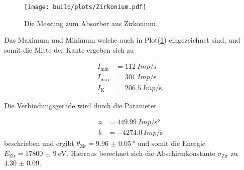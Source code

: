           \begin{figure}[H]
            \centering
            \texttt{[image: build/plots/Zirkonium.pdf]}
            \caption{Die Messung zum Absorber aus Zirkonium.}
            \label{fig:zirkonium}
          \end{figure}

          \noindent Das Maximum und Minimum welche auch in Plot(\ref{fig:zirkonium}) eingezeichnet sind, und somit die Mitte der Kante ergeben sich 
          zu

          \begin{align*}
              I_{\text{min}} &= \SI{112}{Imp\per\second}\\
              I_{\text{max}} &= \SI{301}{Imp\per\second}\\
              I_{\text{K}} &= \SI{206.5}{Imp\per\second} .
          \end{align*}

          \noindent Die Verbindungsgerade wird durch die Parameter 

          \begin{align*}
              a & = \SI{449.99}{Imp\per\second\degree}\\
              b & = \SI{-4274.0}{Imp\per\second}
          \end{align*}
          \noindent beschrieben und ergibt $\theta_{\text{Zir}} = \SI{9.96(5)}{\degree}$ und somit die Energie $E_{\text{Zir}} = \SI{17800(9)}{\electronvolt}$. 
          Hierraus berechnet sich die Abschirmkonstante $\sigma_{\text{Zir}}$ zu $ \num{4.30(9)}$.

    
            
            
            

           

    



        



